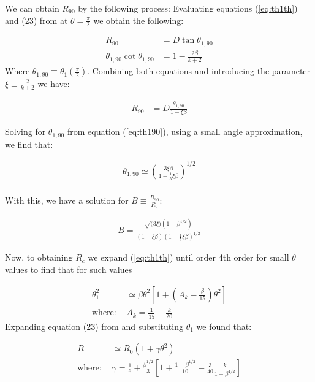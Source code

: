 We can obtain $R_{90}$ by the following process:
Evaluating equations  (\ref{eq:th1th}) and (23) from \CRW{} at $\theta=\frac{\pi}{2}$ we obtain the following:

\begin{align}
R_{90} &= D\tan\theta_{1,90} \\
\theta_{1,90}\cot\theta_{1,90} &= 1-\frac{2\beta}{k+2} \label{eq:th190}
\end{align}
Where $\theta_{1,90}\equiv \theta_1(\frac{\pi}{2})$. Combining both equations and  introducing the parameter 
$\xi\equiv \frac{2}{k+2}$ we have:

\begin{align}
R_{90} &= D\frac{\theta_{1,90}}{1-\xi\beta} 
\end{align}


Solving for $\theta_{1,90}$ from equation (\ref{eq:th190}), using a small angle  approximation, we find that:

\begin{align}
\theta_{1,90} \simeq \left(\frac{3\xi\beta}{1+\frac{1}{5}\xi\beta}\right)^{1/2} \\
\label{eq:th190sol}
\end{align}

With this, we have a solution for $B \equiv \frac{R_{90}}{R_0}$:

\begin{align}
B = \frac{\sqrt(3\xi)\left(1+\beta^{1/2}\right)}{(1-\xi\beta)\left(1+\frac{1}{5}\xi\beta\right)^{1/2}}
\label{eq:B}
\end{align}

Now, to obtaining $R_c$ we expand  (\ref{eq:th1th}) until order 4th order for small $\theta$ values to find that for such values

\begin{align}
\theta_1^2 &\simeq \beta\theta^2\left[1+ \left(A_k-\frac{\beta}{15}\right)\theta^2\right] \\
\mathrm{where:~} & A_k = \frac{1}{15}-\frac{k}{20}
\end{align}
Expanding equation (23) from \citep{Canto:1996} and substituting $\theta_1$ we found that:

\begin{align}
R &\simeq R_0 \left(1+\gamma\theta^2\right)
\label{eq:R_approx} \\
\mathrm{where:~} & \gamma = \frac{1}{6} + \frac{\beta^{1/2}}{3}\left[1+\frac{1-\beta^{1/2}}{10}-\frac{3}{40}\frac{k}{1+\beta^{1/2}}\right]
\end{align}

